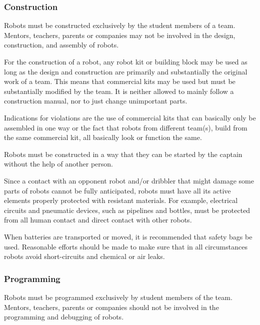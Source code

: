 \documentclass{article}
\begin{document}
\subsubsection{Construction \label{ref-057}}

Robots must be constructed exclusively by the student members of a team.
Mentors, teachers, parents or companies may not be involved in the design,
construction, and assembly of robots.

For the construction of a robot, any robot kit or building block may be used as
long as the design and construction are primarily and substantially the
original work of a team. This means that commercial kits may be used but must
be substantially modified by the team. It is neither allowed to mainly follow a
construction manual, nor to just change unimportant parts.

Indications for violations are the use of commercial kits that can basically
only be assembled in one way or the fact that robots from different team(s),
build from the same commercial kit, all basically look or function the same.

Robots must be constructed in a way that they can be started by the captain
without the help of another person.

Since a contact with an opponent robot and/or dribbler that might damage some
parts of robots cannot be fully anticipated, robots must have all its active
elements properly protected with resistant materials. For example, electrical
circuits and pneumatic devices, such as pipelines and bottles, must be
protected from all human contact and direct contact with other robots.

When batteries are transported or moved, it is recommended that safety bags be
used. Reasonable efforts should be made to make sure that in all circumstances
robots avoid short-circuits and chemical or air leaks. 


\subsubsection{Programming \label{ref-058}}

Robots must be programmed exclusively by student members of the team. Mentors,
teachers, parents or companies should not be involved in the programming and
debugging of robots.
\end{document}
